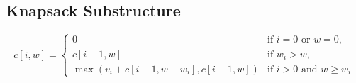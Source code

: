 \documentclass{article}
\begin{document}
\subsection*{Knapsack Substructure}
\begin{equation*}
    c[i, w] = \begin{cases}
        0                                        & \text{if } i = 0 \text{ or } w = 0,      \\
        c[i - 1, w]                              & \text{if } w_i > w,                      \\
        \max(v_i + c[i - 1, w-w_i], c[i - 1, w]) & \text{if } i > 0 \text{ and } w \geq w_i
    \end{cases}
\end{equation*}
\end{document}
